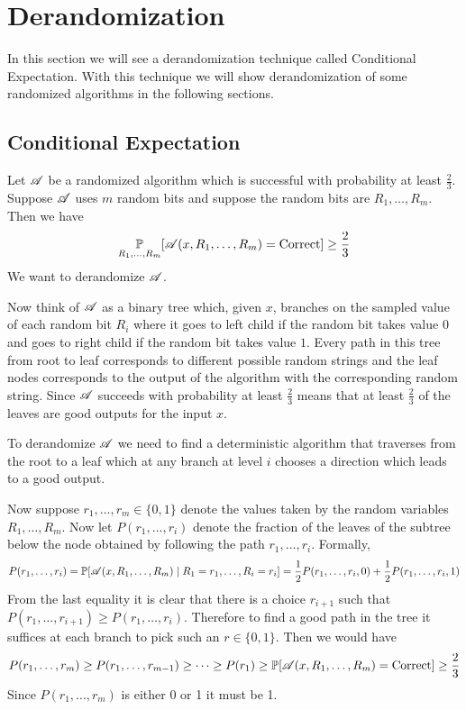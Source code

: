 \chapter{Derandomization}
In this section we will see a derandomization technique called Conditional Expectation. With this technique we will show derandomization of some randomized algorithms in the following sections.
\section{Conditional Expectation}
Let ${\mathscr{A}}$ be a randomized algorithm which is successful with probability at least $\frac23$. Suppose ${\mathscr{A}}$ uses $m$ random bits and suppose the random bits are $R_1,\dots , R_m$. Then we have $$\underset{R_1,\dots, R_m}{\mathbb{P}}[{\mathscr{A}}(x,R_1,\dots, R_m)=\text{Correct}]\geq \frac23$$We want to derandomize ${\mathscr{A}}$.

Now think of ${\mathscr{A}}$ as a binary tree which, given $x$, branches on the sampled value of each random bit $R_i$ where it goes to left child if the random bit takes value $0$ and goes to right child if the random bit takes value $1$. Every path in this tree from root to leaf corresponds to different possible random strings and the leaf nodes corresponds to the output of the algorithm with the corresponding random string. Since ${\mathscr{A}}$ succeeds with probability at least $\frac23$ means that at least $\frac23$ of the leaves are good outputs for the input $x$.

\begin{idea*}
	To derandomize ${\mathscr{A}}$ we need to find a deterministic algorithm that traverses from the root to a leaf which at any branch at level $i$ chooses a direction which leads to a good output.
\end{idea*}

Now suppose $r_1,\dots, r_m\in \{0,1\}$ denote the values taken by the random variables $R_1,\dots, R_m$. Now let $P(r_1,\dots, r_i)$ denote the fraction of the leaves of the subtree below the node obtained  by following the path $r_1,\dots, r_i$. Formally, $$P(r_1,\dots, r_i)=\mathbb{P}[{\mathscr{A}}(x,R_1,\dots, R_m)\mid R_1=r_1,\dots, R_i=r_i]=\frac12P(r_1,\dots, r_i,0)+\frac12P(r_1,\dots, r_i,1)$$From the last equality it is clear that there is a choice $r_{i+1}$ such that $P(r_1,\dots, r_{i+1})\geq P(r_1,\dots, r_i)$. Therefore to find a good path in the tree it suffices at each branch to pick such an $r\in \{0,1\}$. Then we would have $$P(r_1,\dots,r_m)\geq P(r_1,\dots, r_{m-1})\geq \cdots\geq P(r_1)\geq \mathbb{P}[{\mathscr{A}}(x, R_1,\dots, R_m)=\text{Correct}]\geq \frac23$$Since $P(r_1,\dots, r_m)$ is either 0 or 1 it must be 1.
